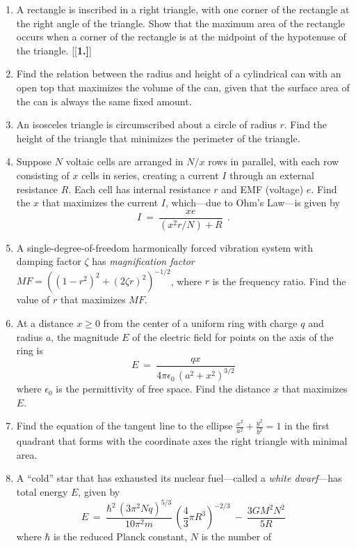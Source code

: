 {\begin{enumerate}[\bfseries 1.]
{}
 \item A rectangle is inscribed in a right triangle, with one corner of the
 rectangle at the right angle of the triangle. Show that the maximum area of the
 rectangle occurs when a corner of the rectangle is at the midpoint of the
 hypotenuse of the triangle.
[{[\bfseries 1.]}]
 \item Find the relation between the radius and height of a cylindrical can with
  an open top that maximizes the volume of the can, given that the surface area
  of the can is always the same fixed amount.
 \item An isosceles triangle is circumscribed about a circle of radius $r$. Find
  the height of the triangle that minimizes the perimeter of the triangle.
 \item Suppose $N$ voltaic cells are arranged in $N/x$ rows in
  parallel, with each row consisting of $x$ cells in series, creating a current
  $I$ through an external resistance $R$. Each cell has internal resistance
  $r$ and EMF (voltage) $e$. Find the $x$ that maximizes the current $I$,
  which---due to Ohm's Law---is given by
\[
I ~=~ \dfrac{xe}{(x^2 r/N) + R} ~~.
\]
 \item A single-degree-of-freedom harmonically forced vibration system with
damping factor $\zeta$ has \emph{magnification factor}
$MF = ((1 - r^2)^2 + (2\zeta r)^2)^{-1/2}$, where $r$ is the frequency ratio.
Find the value of $r$ that maximizes $MF$.
 \item At a distance $x\ge0$ from the center of a uniform ring with charge $q$
and radius $a$, the magnitude $E$ of the electric field for points on the axis
of the ring is 
\[
E ~=~ \frac{qx}{4 \pi \epsilon_0\,(a^2 + x^2)^{3/2}}
\]
where $\epsilon_0$ is the permittivity of free space. Find the distance $x$ that
maximizes $E$.
 \item Find the equation of the tangent line to the ellipse
  $\frac{x^2}{a^2}+\frac{y^2}{b^2}=1$ in the first quadrant that forms with the
  coordinate axes the right triangle with minimal area.
 \item A ``cold'' star that has exhausted its nuclear fuel---called a
\emph{white dwarf}---has total energy $E$, given by
\[
E ~=~ \frac{\hbar^2 \,(3 \pi^2 Nq)^{5/3}}{10 \pi^2 m}\,\left(\frac{4}{3} \pi R^3\right)^{-2/3}
  ~-~ \frac{3 G M^2 N^2}{5R}
\]
where $\hbar$ is the reduced Planck constant, $N$ is the number of

\end{enumerate}}
